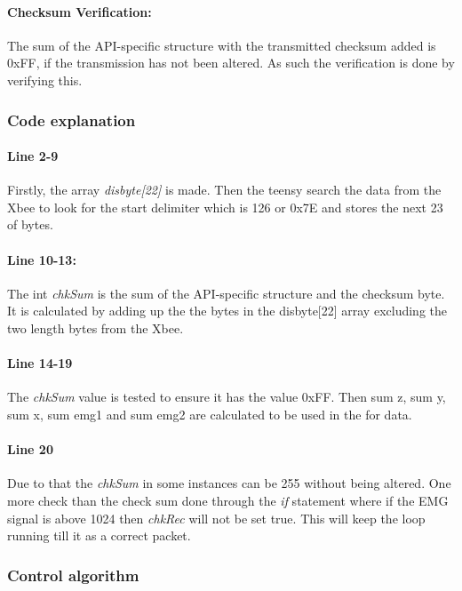 \paragraph{Checksum Verification:}
The sum of the API-specific structure with the transmitted checksum added is 0xFF, if the transmission has not been altered. As such the verification is done by verifying this.

\subsubsection{Code explanation}
 \label{CheckSumCode}
\paragraph{Line 2-9}Firstly, the array \textit{disbyte[22]} is made.
Then the teensy search the data from the Xbee to look for the start delimiter which is 126 or 0x7E and stores the next 23 of bytes.
\paragraph{Line 10-13:}The int \textit{chkSum} is the sum of the API-specific structure and the checksum byte. It is calculated by adding up the the bytes in the disbyte[22] array excluding the two length bytes from the Xbee.

\paragraph{Line 14-19}The \textit{chkSum} value is tested to ensure it has the value 0xFF. Then sum z, sum y, sum x, sum emg1 and sum emg2 are calculated to be used in the for data.


\paragraph{Line 20} Due to that the \textit{chkSum} in some instances can be 255 without being altered. One more check than the check sum done through the \textit{if} statement where if the EMG signal is above 1024 then \textit{chkRec} will not be set true. This will keep the loop running till it as a correct packet.
\subsubsection{Control algorithm}


%

